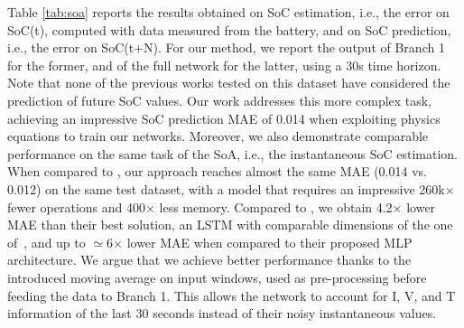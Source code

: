 Table \ref{tab:soa} reports the results obtained on SoC estimation, i.e., the error on SoC(t), computed with data measured from the battery, and on SoC prediction, i.e., the error on SoC(t+N). 
%
%
For our method, we report the output of Branch 1 for the former, and of the full network for the latter,
%
using a 30s time horizon.
%
Note that none of the previous works tested on this dataset have considered the prediction of future SoC values. Our work addresses this more complex task, achieving an impressive SoC prediction MAE of 0.014 when exploiting physics equations to train our networks.
Moreover, we also demonstrate comparable performance on the same task of the SoA, i.e., the instantaneous SoC estimation.
When compared to \cite{wong-2021}, our approach reaches almost the same MAE (0.014 vs. 0.012) on the same test dataset, with a model that requires an impressive 260k$\times$ fewer operations and 400$\times$ less memory.
Compared to \cite{Dang23}, we obtain 4.2$\times$ lower MAE than their best solution, an LSTM with comparable dimensions of the one of~\cite{wong-2021}, and up to $\simeq$6$\times$ lower MAE when compared to their proposed MLP architecture.
We argue that we achieve better performance thanks to the introduced moving average on input windows, used as pre-processing before feeding the data to Branch 1. This allows the network to account for I, V, and T information of the last 30 seconds instead of their noisy instantaneous values.
